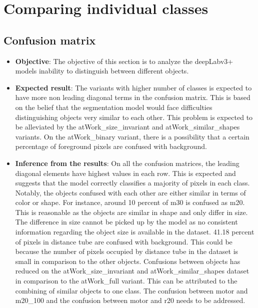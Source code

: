 \section{Comparing individual classes}

	\subsection{Confusion matrix}
		\begin{itemize}
			\item \textbf{Objective}: The objective of this section is to analyze the deepLabv3+ models inability to distinguish between different objects. 
			\item \textbf{Expected result}: The variants with higher number of classes is expected to have more non leading diagonal terms in the confusion matrix. This is based on the belief that the segmentation model would face difficulties distinguishing objects very similar to each other. This problem is expected to be alleviated by the atWork\_size\_invariant and atWork\_similar\_shapes variants. On the atWork\_binary variant, there is a possibility that a certain percentage of foreground pixels are confused with background.
			\item \textbf{Inference from the results}: On all the confusion matrices, the leading diagonal elements have highest values in each row. This is expected and suggests that the model correctly classifies a majority of pixels in each class. Notably, the objects confused with each other are either similar in terms of color or shape. For instance, around 10 percent of m30 is confused as m20. This is reasonable as the objects are similar in shape and only differ in size. The difference in size cannot be picked up by the model as no consistent information regarding the object size is available in the dataset. 41.18 percent of pixels in distance tube are confused with background. This could be because the number of pixels occupied by distance tube in the dataset is small in comparison to the other objects.
			Confusions between objects has reduced on the atWork\_size\_invariant and atWork\_similar\_shapes dataset in comparison to the atWork\_full variant. This can be attributed to the combining of similar objects to one class. The confusion between motor and m20\_100 and the confusion between motor and r20 needs to be addressed.
		\end{itemize}

